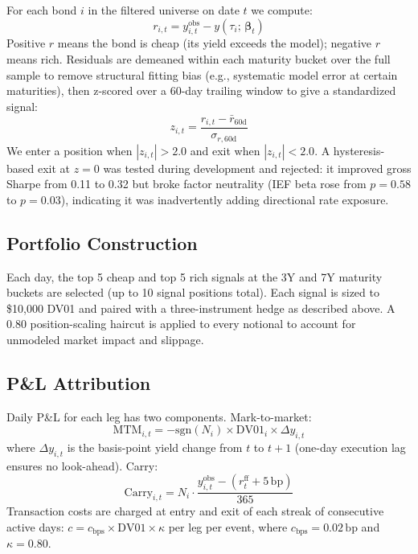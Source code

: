 \documentclass[11pt]{article}
\begin{document}
For each bond $i$ in the filtered universe on date $t$ we compute:
\begin{equation}
  r_{i,t} = y_{i,t}^{\text{obs}} - y(\tau_i;\,\boldsymbol{\beta}_t)
\end{equation}
Positive $r$ means the bond is cheap (its yield exceeds the model); negative
$r$ means rich. Residuals are demeaned within each maturity bucket over the
full sample to remove structural fitting bias (e.g., systematic model error
at certain maturities), then z-scored over a 60-day trailing window to give
a standardized signal:
\begin{equation}
  z_{i,t} = \frac{r_{i,t} - \bar{r}_{\text{60d}}}{\sigma_{r,\text{60d}}}
\end{equation}
We enter a position when $|z_{i,t}| > 2.0$ and exit when $|z_{i,t}| < 2.0$.
A hysteresis-based exit at $z = 0$ was tested during development and rejected:
it improved gross Sharpe from 0.11 to 0.32 but broke factor neutrality
(IEF beta rose from $p=0.58$ to $p=0.03$), indicating it was inadvertently
adding directional rate exposure.

\subsection{Portfolio Construction}

Each day, the top 5 cheap and top 5 rich signals at the 3Y and 7Y maturity
buckets are selected (up to 10 signal positions total). Each signal is sized
to \$10{,}000 DV01 and paired with a three-instrument hedge as described above.
A 0.80 position-scaling haircut is applied to every notional to account for
unmodeled market impact and slippage.

\subsection{P\&L Attribution}

Daily P\&L for each leg has two components. Mark-to-market:
\[
  \text{MTM}_{i,t} = -\text{sgn}(N_i) \times \text{DV01}_i \times
  \Delta y_{i,t}
\]
where $\Delta y_{i,t}$ is the basis-point yield change from $t$ to $t+1$
(one-day execution lag ensures no look-ahead). Carry:
\[
  \text{Carry}_{i,t} = N_i \cdot
  \frac{y_{i,t}^{\text{obs}} - (r_t^{\text{ff}} + 5\,\text{bp})}{365}
\]
Transaction costs are charged at entry and exit of each streak of consecutive
active days: $c = c_{\text{bps}} \times \text{DV01} \times \kappa$ per leg per
event, where $c_{\text{bps}} = 0.02\,\text{bp}$ and $\kappa = 0.80$.
\end{document}
